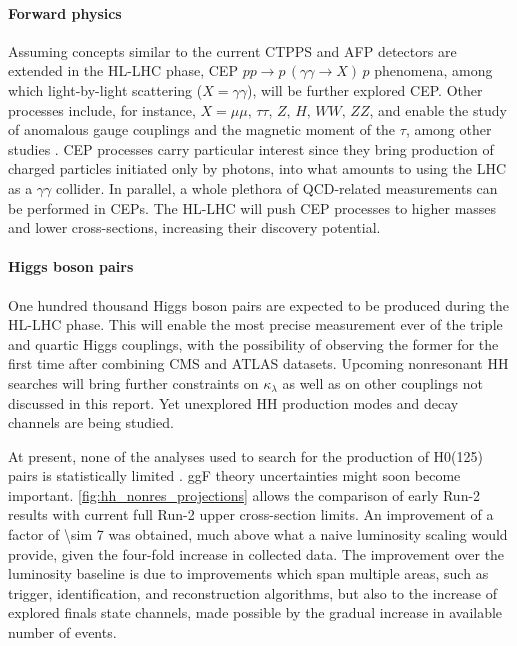 \documentclass[11pt]{article}
\newcommand{\kl}{\kappa_{\lambda}}
\newcommand{\run}[1]{Run-#1}
\begin{document}
\paragraph{Forward physics}

Assuming concepts similar to the current \ac{CTPPS} \cite{ctpps_tdr} and \ac{AFP} \cite{afp_tdr} detectors are extended in the \ac{HL-LHC} phase, \ac{CEP} \(pp \rightarrow p\,(\gamma\gamma\rightarrow X)\,p\) phenomena, among which light-by-light scattering (\(X = \gamma\gamma\)), will be further explored \ac{CEP}.
Other processes include, for instance, \(X = \mu\mu,\,\tau\tau,\,Z,\,H,\,WW,\,ZZ\), and enable the study of anomalous gauge couplings and the magnetic moment of the \(\tau\), among other studies \cite{ctpps_varela,ctpps_pitt}.
\ac{CEP} processes carry particular interest since they bring production of charged particles initiated only by photons, into what amounts to using the \ac{LHC} as a \(\gamma\gamma\) collider.
In parallel, a whole plethora of \ac{QCD}-related measurements can be performed in \acp{CEP}.
The \ac{HL-LHC} will push \ac{CEP} processes to higher masses and lower cross-sections, increasing their discovery potential.


\paragraph{Higgs boson pairs}

One hundred thousand Higgs boson pairs are expected to be produced during the \ac{HL-LHC} phase.
This will enable the most precise measurement ever of the triple and quartic Higgs couplings, with the possibility of observing the former for the first time after combining \ac{CMS} and \ac{ATLAS} datasets.
Upcoming nonresonant HH searches will bring further constraints on \(\kl\) as well as on other couplings not discussed in this report.
Yet unexplored HH production modes and decay channels are being studied.


At present, none of the analyses used to search for the production of H0(125) pairs is statistically limited \cite{andre_david_higgs_ten_years}.
\ac{ggF} theory uncertainties might soon become important.
\cref{fig:hh_nonres_projections} allows the comparison of early \run{2} results with current full \run{2} upper cross-section limits.
An improvement of a factor of \num{\sim 7} was obtained, much above what a naive luminosity scaling would provide, given the four-fold increase in collected data.
The improvement over the luminosity baseline is due to improvements which span multiple areas, such as trigger, identification, and reconstruction algorithms, but also to the increase of explored finals state channels, made possible by the gradual increase in available number of events.
\end{document}
